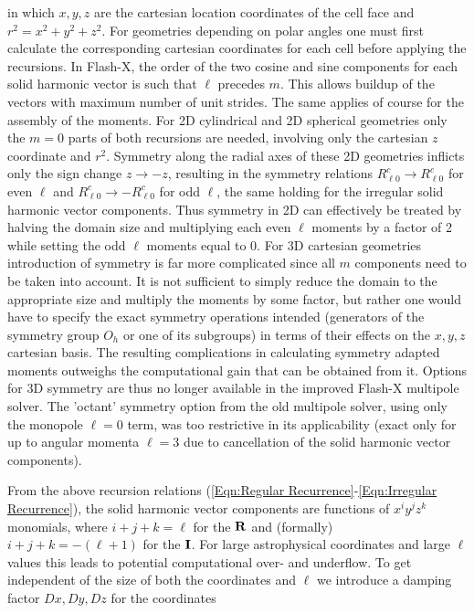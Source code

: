 in which $x,y,z$ are the cartesian location coordinates of the cell face and $r^2=x^2+y^2+z^2$.
For geometries depending on polar angles one must first calculate the corresponding cartesian
coordinates for each cell before applying the recursions. In Flash-X, the order of the two cosine
and sine components for each solid harmonic vector is such that $\ell$ precedes $m$.
This allows buildup of the vectors with maximum number of unit strides. The same
applies of course for the assembly of the moments. For 2D cylindrical and 2D spherical geometries
only the $m=0$ parts of both recursions are needed, involving only the cartesian $z$ coordinate
and $r^2$. Symmetry along the radial axes of these 2D geometries inflicts only the sign change
$z\rightarrow -z$, resulting in the symmetry relations $R_{\ell 0}^c\rightarrow R_{\ell 0}^c$ for
even $\ell$ and $R_{\ell 0}^c\rightarrow -R_{\ell 0}^c$ for odd $\ell$, the same holding for the
irregular solid harmonic vector components. Thus symmetry in 2D can effectively be treated
by halving the domain size and multiplying each even $\ell$ moments by a factor of 2 while setting
the odd $\ell$ moments equal to 0. For 3D cartesian geometries introduction of symmetry
is far more complicated since all $m$ components need to be taken into account. It is not
sufficient to simply reduce the domain to the appropriate size and multiply the moments
by some factor, but rather one would have to specify the exact symmetry operations intended
(generators of the symmetry group $O_h$ or one of its subgroups) in terms of their effects
on the $x,y,z$ cartesian basis. The resulting complications in calculating symmetry adapted moments
outweighs the computational gain that can be obtained from it. Options for 3D symmetry are
thus no longer available in the improved Flash-X multipole solver. The 'octant' symmetry option
from the old multipole solver, using only the monopole $\ell=0$ term, was too restrictive in
its applicability (exact only for up to angular momenta $\ell =3$ due to cancellation of the
solid harmonic vector components).
\par
From the above recursion relations (\ref{Eqn:Regular Recurrence}-\ref{Eqn:Irregular Recurrence}),
the solid harmonic vector components are functions
of $x^iy^jz^k$ monomials, where $i+j+k=\ell$ for the ${\bf R}$ and (formally)
$i+j+k=-(\ell+1)$ for the ${\bf I}$. For large astrophysical coordinates and large $\ell$ values this leads
to potential computational over- and underflow. To get independent of the size of both
the coordinates and $\ell$ we introduce a damping factor $Dx,Dy,Dz$ for the coordinates
